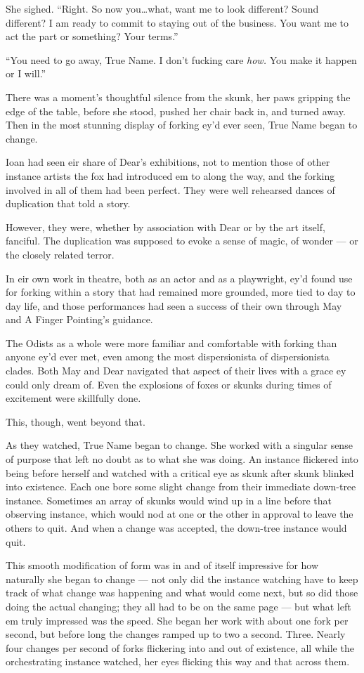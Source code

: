 She sighed. ``Right. So now you\ldots what, want me to look different? Sound different? I am ready to commit to staying out of the business. You want me to act the part or something? Your terms.''

``You need to go away, True Name. I don't fucking care \emph{how.} You make it happen or I will.''

There was a moment's thoughtful silence from the skunk, her paws gripping the edge of the table, before she stood, pushed her chair back in, and turned away. Then in the most stunning display of forking ey'd ever seen, True Name began to change.

Ioan had seen eir share of Dear's exhibitions, not to mention those of other instance artists the fox had introduced em to along the way, and the forking involved in all of them had been perfect. They were well rehearsed dances of duplication that told a story.

However, they were, whether by association with Dear or by the art itself, fanciful. The duplication was supposed to evoke a sense of magic, of wonder — or the closely related terror.

In eir own work in theatre, both as an actor and as a playwright, ey'd found use for forking within a story that had remained more grounded, more tied to day to day life, and those performances had seen a success of their own through May and A Finger Pointing's guidance.

The Odists as a whole were more familiar and comfortable with forking than anyone ey'd ever met, even among the most dispersionista of dispersionista clades. Both May and Dear navigated that aspect of their lives with a grace ey could only dream of. Even the explosions of foxes or skunks during times of excitement were skillfully done.

This, though, went beyond that.

As they watched, True Name began to change. She worked with a singular sense of purpose that left no doubt as to what she was doing. An instance flickered into being before herself and watched with a critical eye as skunk after skunk blinked into existence. Each one bore some slight change from their immediate down-tree instance. Sometimes an array of skunks would wind up in a line before that observing instance, which would nod at one or the other in approval to leave the others to quit. And when a change was accepted, the down-tree instance would quit.

This smooth modification of form was in and of itself impressive for how naturally she began to change — not only did the instance watching have to keep track of what change was happening and what would come next, but so did those doing the actual changing; they all had to be on the same page — but what left em truly impressed was the speed. She began her work with about one fork per second, but before long the changes ramped up to two a second. Three. Nearly four changes per second of forks flickering into and out of existence, all while the orchestrating instance watched, her eyes flicking this way and that across them.

